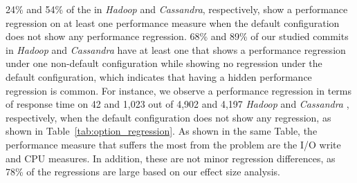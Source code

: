 24\% and 54\% of the \instance in \emph{Hadoop} and \emph{Cassandra}, respectively, show a performance regression on at least one performance measure when the default configuration does not show any performance regression. %
68\% and 89\% of our studied commits in \emph{Hadoop} and \emph{Cassandra} have at least one \instance that shows a performance regression under one non-default configuration while showing no regression under the default configuration, which indicates that having a hidden performance regression is common. For instance, we observe a performance regression in terms of response time on 42 and 1,023 out of 4,902 and 4,197 \emph{Hadoop} and \emph{Cassandra} \instance, respectively, when the default configuration does not show any regression, as shown in Table~\ref{tab:option_regression}. As shown in the same Table, the performance measure that suffers the most from the \inconsistent problem %
are the I/O write and CPU measures. %
In addition, these are not minor regression differences, as 78\% of the regressions are large based on our effect size analysis. 



